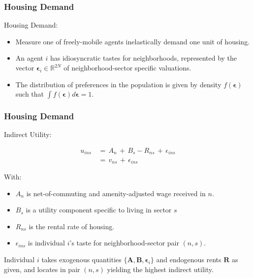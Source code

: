 \documentclass[aspectratio=149]{beamer}
\begin{document}

\begin{frame}
\frametitle{Housing Demand}

Housing Demand:
\vspace{2mm}
\begin{itemize}
  \item Measure one of freely-mobile agents inelastically demand one unit of housing.
  \vspace{2mm}
  \item An agent $i$ has idiosyncratic tastes for neighborhoods, represented by the vector $\bm{\epsilon}_i \in \mathbb{R}^{2N}$ of neighborhood-sector specific valuations.
  \vspace{2mm}
  \item The distribution of preferences in the population is given by density $f(\bm{\epsilon})$ such that $\int f(\bm{\epsilon}) d\bm{\epsilon} = 1$.
\end{itemize}


\end{frame}


\begin{frame}
\frametitle{Housing Demand}

Indirect Utility:

\begin{equation*}
\begin{aligned}
u_{ins} \,& =\, A_n\,+\, B_s - R_{ns} \,+\, \epsilon_{ins} \\
        \,& =\, v_{ns} \,+\, \epsilon_{ins}
\end{aligned}
\end{equation*}

With:
\vspace{2mm}
\begin{itemize}
  \item $A_n$ is net-of-commuting and amenity-adjusted wage received in $n$.
  \item $B_s$ is a utility component specific to living in sector $s$
  \item $R_{ns}$ is the rental rate of housing.
  \item $\epsilon_{ins}$ is individual $i$'s taste for neighborhood-sector pair $(n,s)$.
\end{itemize}

\vspace{5mm}

Individual $i$ takes exogenous quantities $\{\bm{A},\bm{B},\bm{\epsilon}_i\}$ and endogenous rents $\bm{R}$ as given, and locates in pair $(n,s)$ yielding the highest indirect utility.


\end{frame}
\end{document}
